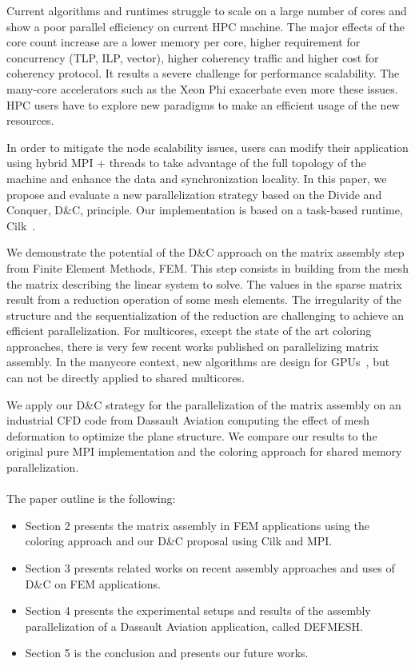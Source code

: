 \documentclass{IOS-Book-Article}
\begin{document}
Current algorithms and runtimes struggle to scale on a large number of cores and show a poor parallel efficiency on current HPC machine. 
The major effects of the core count increase are a lower memory per core, higher requirement for concurrency (TLP, ILP, vector), higher coherency traffic and higher cost
for coherency protocol.
It results a severe challenge for performance scalability. The many-core accelerators such as the Xeon Phi exacerbate even more these issues.
HPC users have to explore new paradigms to make an efficient usage of the new resources. 

In order to mitigate the node scalability issues, users can modify their application using hybrid MPI + threads to take advantage of the full topology of the machine
and enhance the data and synchronization locality.
In this paper, we propose and evaluate a new parallelization strategy based on the Divide and Conquer, D\&C, principle. Our implementation is based on a task-based runtime,
Cilk~\cite{cilk5}. 

We demonstrate the potential of the D\&C approach on the matrix assembly step from Finite Element Methods, FEM.
This step consists in building from the mesh the matrix describing the linear system to solve.
The values in the sparse matrix result from a reduction operation of some mesh elements.
The irregularity of the structure and the sequentialization of the reduction are challenging to achieve an efficient parallelization.
For multicores, except the state of the art coloring approaches, there is very few recent works published on parallelizing matrix assembly.
In the manycore context, new algorithms are design for GPUs~\cite{cecka2011assembly,CPUGPUasm}, but can not be directly applied to shared multicores.

We apply our D\&C strategy for the parallelization of the matrix assembly on an industrial CFD code from Dassault Aviation computing the effect of mesh deformation
to optimize the plane structure.
We compare our results to the original pure MPI implementation and the coloring approach for shared memory parallelization.
\\\\
The paper outline is the following:
\begin{itemize}
\item Section 2 presents the matrix assembly in FEM applications using the coloring approach and our D\&C proposal using Cilk and MPI.
\item Section 3 presents related works on recent assembly approaches and uses of D\&C on FEM applications.
\item Section 4 presents the experimental setups and results of the assembly parallelization of a Dassault Aviation application, called DEFMESH.
\item Section 5 is the conclusion and presents our future works.
\end{itemize}
\end{document}
